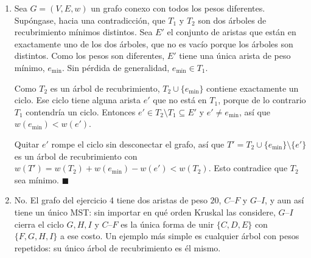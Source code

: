 \ejercicio{}

\begin{enumerate}[label=(\alph*)]
  \item Sea $G = (V, E, w)$ un grafo conexo con todos los pesos diferentes. Supóngase, hacia una contradicción, que $T_1$ y $T_2$ son dos árboles de recubrimiento mínimos distintos. Sea $E'$ el conjunto de aristas que están en exactamente uno de los dos árboles, que no es vacío porque los árboles son distintos. Como los pesos son diferentes, $E'$ tiene una única arista de peso mínimo, $e_{\min}$. Sin pérdida de generalidad, $e_{\min} \in T_1$.

  Como $T_2$ es un árbol de recubrimiento, $T_2 \cup \{e_{\min}\}$ contiene exactamente un ciclo. Ese ciclo tiene alguna arista $e'$ que no está en $T_1$, porque de lo contrario $T_1$ contendría un ciclo. Entonces $e' \in T_2 \setminus T_1 \subseteq E'$ y $e' \neq e_{\min}$, así que $w(e_{\min}) < w(e')$.

  Quitar $e'$ rompe el ciclo sin desconectar el grafo, así que $T' = T_2 \cup \{e_{\min}\} \setminus \{e'\}$ es un árbol de recubrimiento con $w(T') = w(T_2) + w(e_{\min}) - w(e') < w(T_2)$. Esto contradice que $T_2$ sea mínimo. \hfill$\blacksquare$

  \item No. El grafo del ejercicio 4 tiene dos aristas de peso $20$, $C$--$F$ y $G$--$I$, y aun así tiene un único MST: sin importar en qué orden Kruskal las considere, $G$--$I$ cierra el ciclo $G, H, I$ y $C$--$F$ es la única forma de unir $\{C, D, E\}$ con $\{F, G, H, I\}$ a ese costo. Un ejemplo más simple es cualquier árbol con pesos repetidos: su único árbol de recubrimiento es él mismo.
\end{enumerate}
